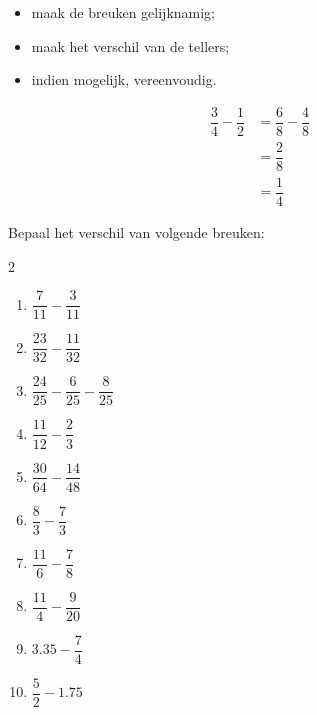 \documentclass{bis}
\begin{document}
\begin{itemize}
  \item maak de breuken gelijknamig;
  \item maak het verschil van de tellers;
  \item indien mogelijk, vereenvoudig.
\end{itemize}

\begin{voorbeeld}
\begin{align*}
  \dfrac{3}{4} - \dfrac{1}{2} &= \dfrac{6}{8} - \dfrac{4}{8}\\
                              &= \dfrac{2}{8}\\
                              &= \dfrac{1}{4}
\end{align*}
\end{voorbeeld}

\begin{exercise}
Bepaal het verschil van volgende breuken:
\begin{multicols}{2}
  \begin{enumerate}
    \item $\dfrac{7}{11}-\dfrac{3}{11}$
    \item $\dfrac{23}{32}-\dfrac{11}{32}$
    \item $\dfrac{24}{25}-\dfrac{6}{25}-\dfrac{8}{25}$
    \item $\dfrac{11}{12}-\dfrac{2}{3}$
    \item $\dfrac{30}{64}-\dfrac{14}{48}$
    \item $\dfrac{8}{3}-\dfrac{7}{3}$
    \item $\dfrac{11}{6}-\dfrac{7}{8}$
    \item $\dfrac{11}{4}-\dfrac{9}{20}$
    \item $3.35-\dfrac{7}{4}$
    \item $\dfrac{5}{2}-1.75$
  \end{enumerate}
\end{multicols}
\end{exercise}
\end{document}
